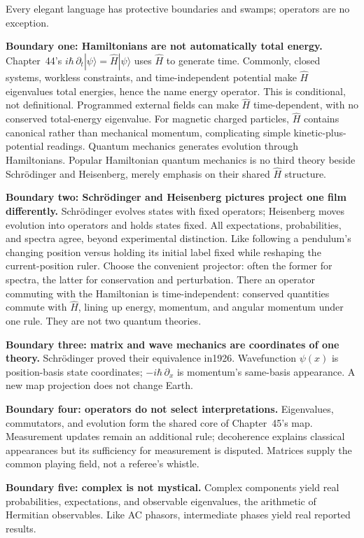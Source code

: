 
Every elegant language has protective boundaries and swamps; operators are no exception.

\textbf{Boundary one: Hamiltonians are not automatically total energy.} Chapter~44's $i\hbar\,\partial_t|\psi\rangle=\hat{H}|\psi\rangle$ uses $\hat{H}$ to generate time. Commonly, closed systems, workless constraints, and time-independent potential make $\hat{H}$ eigenvalues total energies, hence the name energy operator. This is conditional, not definitional. Programmed external fields can make $\hat{H}$ time-dependent, with no conserved total-energy eigenvalue. For magnetic charged particles, $\hat{H}$ contains canonical rather than mechanical momentum, complicating simple kinetic-plus-potential readings. Quantum mechanics generates evolution through Hamiltonians. Popular Hamiltonian quantum mechanics is no third theory beside Schrödinger and Heisenberg, merely emphasis on their shared $\hat{H}$ structure.

\textbf{Boundary two: Schrödinger and Heisenberg pictures project one film differently.} Schrödinger evolves states with fixed operators; Heisenberg moves evolution into operators and holds states fixed. All expectations, probabilities, and spectra agree, beyond experimental distinction. Like following a pendulum's changing position versus holding its initial label fixed while reshaping the current-position ruler. Choose the convenient projector: often the former for spectra, the latter for conservation and perturbation. There an operator commuting with the Hamiltonian is time-independent: conserved quantities commute with $\hat{H}$, lining up energy, momentum, and angular momentum under one rule. They are not two quantum theories.

\textbf{Boundary three: matrix and wave mechanics are coordinates of one theory.} Schrödinger proved their equivalence in1926. Wavefunction $\psi(x)$ is position-basis state coordinates; $-i\hbar\,\partial_x$ is momentum's same-basis appearance. A new map projection does not change Earth.

\textbf{Boundary four: operators do not select interpretations.} Eigenvalues, commutators, and evolution form the shared core of Chapter~45's map. Measurement updates remain an additional rule; decoherence explains classical appearances but its sufficiency for measurement is disputed. Matrices supply the common playing field, not a referee's whistle.

\textbf{Boundary five: complex is not mystical.} Complex components yield real probabilities, expectations, and observable eigenvalues, the arithmetic of Hermitian observables. Like AC phasors, intermediate phases yield real reported results.

